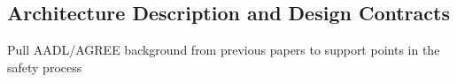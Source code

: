 \subsection{Architecture Description and Design Contracts}
\label{subsec:aadl-agree}

Pull AADL/AGREE background from previous papers to support points in the safety process
